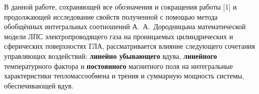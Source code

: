 \vzmscaption




    В  данной  работе,
сохраняющей  все  обозначения
и  сокращения  работы
[1]
и
продолжающей  исследование  свойств
полученной
с  помощью  метода
обобщённых  интегральных  соотношений
А.~А.~Дородницына
математической  модели
ЛПС
электропроводящего  газа
на  проницаемых  цилиндрических
и  сферических  поверхностях
ГЛА,
рассматривается  влияние
следующего  сочетания
управляющих  воздействий:
\textbf{линейно  убывающего}
вдува,
\textbf{линейного}
температурного  фактора
и
\textbf{постоянного}
магнитного  поля
на
интегральные
характеристики
тепломассообмена  и  трения
и
суммарную  мощность
системы,
обеспечивающей  вдув.



